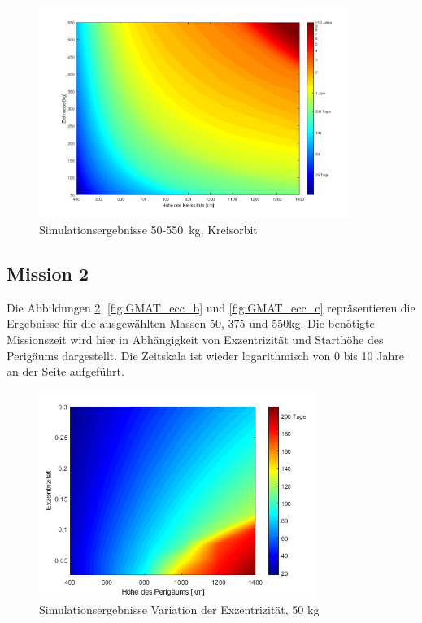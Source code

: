 	

\begin{figure}[H]
	\centering
		\includegraphics[width=0.90\textwidth]{./graphics/GMAT/GMAT_Mass_over_Height_550.png}
		\caption{Simulationsergebnisse \num{50}-\SI{550}{\kg}, Kreisorbit}
	\label{fig:GMAT_Mass_over_Height_b}
\end{figure}


\subsection{Mission 2}
Die Abbildungen \ref{fig:GMAT_ecc_a}, \ref{fig:GMAT_ecc_b} und \ref{fig:GMAT_ecc_c} repräsentieren die Ergebnisse für die ausgewählten Massen \num{50}, \num{375} und \num{550}\si{\kilogram}. Die benötigte Missionszeit wird hier in Abhängigkeit von Exzentrizität und Starthöhe des Perigäums dargestellt. Die Zeitskala ist wieder logarithmisch von \num{0} bis \num{10} Jahre an der Seite aufgeführt.


\begin{figure}[H]
	\centering
		\includegraphics[width=0.80\textwidth]{./graphics/GMAT/ecc_perigee_50kg.png}
		\caption{Simulationsergebnisse Variation der Exzentrizität, 50 kg}
	\label{fig:GMAT_ecc_a}
\end{figure}

